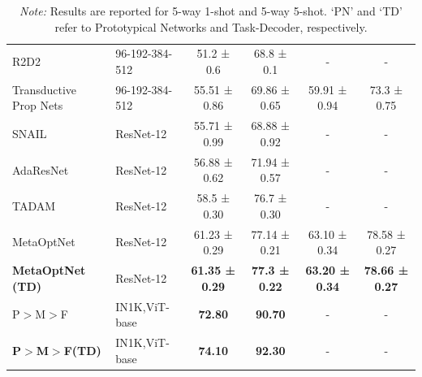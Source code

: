 \begin{table}[htbp]
{\begin{tabular}{ll|cccc}
R2D2\cite{bertinetto2018meta}                   & 96-192-384-512     & 51.2 ± 0.6                       & 68.8 ± 0.1                           & -                                    & -                                    \\
Transductive Prop Nets\cite{liu2018learning} & 96-192-384-512     & 55.51 ± 0.86                     & 69.86 ± 0.65                         & 59.91 ± 0.94                         & 73.3 ± 0.75                          \\
SNAIL\cite{mishra2017simple}                   & ResNet-12          & 55.71 ± 0.99                     & 68.88 ± 0.92                         & -                                    & -                                    \\
AdaResNet\cite{munkhdalai2018rapid}              & ResNet-12          & 56.88 ± 0.62                     & 71.94 ± 0.57                         & -                                    & -                                    \\
TADAM \cite{oreshkin2018tadam2}                 & ResNet-12          & 58.5 ± 0.30                      & 76.7 ± 0.30                          & -                                    & -                                    \\
MetaOptNet                                     & ResNet-12          & 61.23 ± 0.29                     & 77.14 ± 0.21                         & 63.10 ± 0.34                         & 78.58 ± 0.27                         \\
\textbf{MetaOptNet (TD)}             & ResNet-12          & \textbf{61.35 ± 0.29}            & \textbf{77.3 ± 0.22}                 & \textbf{63.20 ± 0.34}                & \textbf{78.66 ± 0.27}\\
{\color{black}P$>$M$>$F}                                     & \color{black}IN1K,ViT-base          & \color{black}\textbf{72.80 }                     & \color{black}\textbf{90.70 }                         & -                         & -                        \\
{\color{black}\textbf{P$>$M$>$F(TD)}}             & \color{black}IN1K,ViT-base          & \color{black}\textbf{74.10 }            & \color{black}\textbf{92.30 }                 & -                & -\\
\bottomrule
\end{tabular}%
}
\caption*{\textit{Note:} Results are reported for 5-way 1-shot and 5-way 5-shot. `PN' and `TD' refer to Prototypical Networks and Task-Decoder, respectively.}
\end{table}

